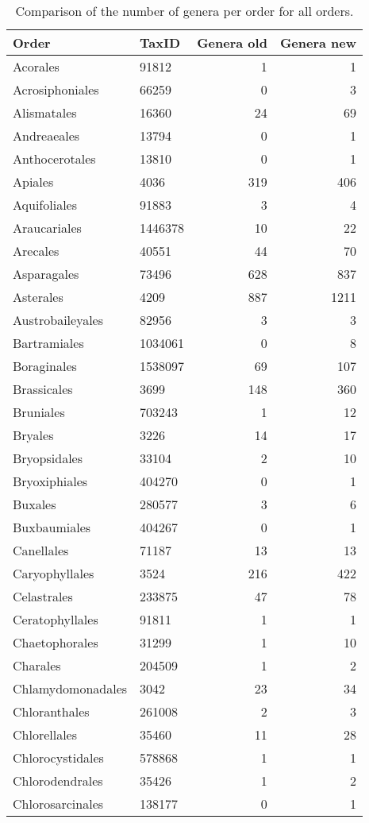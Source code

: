\documentclass{article}
\begin{document}
\begin{longtabu}{lXRR}
\caption{Comparison of the number of genera per order for all orders.}\\
\toprule
Order & TaxID & Genera old & Genera new \\
\midrule
\endhead
Acorales & 91812 & 1 & 1\\
Acrosiphoniales & 66259 & 0 & 3\\
Alismatales & 16360 & 24 & 69\\
Andreaeales & 13794 & 0 & 1\\
Anthocerotales & 13810 & 0 & 1\\
Apiales & 4036 & 319 & 406\\
Aquifoliales & 91883 & 3 & 4\\
Araucariales & 1446378 & 10 & 22\\
Arecales & 40551 & 44 & 70\\
Asparagales & 73496 & 628 & 837\\
Asterales & 4209 & 887 & 1211\\
Austrobaileyales & 82956 & 3 & 3\\
Bartramiales & 1034061 & 0 & 8\\
Boraginales & 1538097 & 69 & 107\\
Brassicales & 3699 & 148 & 360\\
Bruniales & 703243 & 1 & 12\\
Bryales & 3226 & 14 & 17\\
Bryopsidales & 33104 & 2 & 10\\
Bryoxiphiales & 404270 & 0 & 1\\
Buxales & 280577 & 3 & 6\\
Buxbaumiales & 404267 & 0 & 1\\
Canellales & 71187 & 13 & 13\\
Caryophyllales & 3524 & 216 & 422\\
Celastrales & 233875 & 47 & 78\\
Ceratophyllales & 91811 & 1 & 1\\
Chaetophorales & 31299 & 1 & 10\\
Charales & 204509 & 1 & 2\\
Chlamydomonadales & 3042 & 23 & 34\\
Chloranthales & 261008 & 2 & 3\\
Chlorellales & 35460 & 11 & 28\\
Chlorocystidales & 578868 & 1 & 1\\
Chlorodendrales & 35426 & 1 & 2\\
Chlorosarcinales & 138177 & 0 & 1\\

\end{longtabu}
\end{document}
